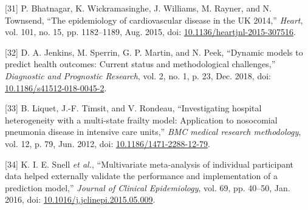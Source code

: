 \documentclass[
]{article}
\newenvironment{cslreferences}%
  {}%
  {\par}
\begin{document}
\begin{cslreferences}
\leavevmode\hypertarget{ref-bhatnagar_epidemiology_2015}{}%
{[}31{]} P. Bhatnagar, K. Wickramasinghe, J. Williams, M. Rayner, and N. Townsend, ``The epidemiology of cardiovascular disease in the UK 2014,'' \emph{Heart}, vol. 101, no. 15, pp. 1182--1189, Aug. 2015, doi: \href{https://doi.org/10.1136/heartjnl-2015-307516}{10.1136/heartjnl-2015-307516}.

\leavevmode\hypertarget{ref-jenkins_dynamic_2018}{}%
{[}32{]} D. A. Jenkins, M. Sperrin, G. P. Martin, and N. Peek, ``Dynamic models to predict health outcomes: Current status and methodological challenges,'' \emph{Diagnostic and Prognostic Research}, vol. 2, no. 1, p. 23, Dec. 2018, doi: \href{https://doi.org/10.1186/s41512-018-0045-2}{10.1186/s41512-018-0045-2}.

\leavevmode\hypertarget{ref-liquet_investigating_2012}{}%
{[}33{]} B. Liquet, J.-F. Timsit, and V. Rondeau, ``Investigating hospital heterogeneity with a multi-state frailty model: Application to nosocomial pneumonia disease in intensive care units,'' \emph{BMC medical research methodology}, vol. 12, p. 79, Jun. 2012, doi: \href{https://doi.org/10.1186/1471-2288-12-79}{10.1186/1471-2288-12-79}.

\leavevmode\hypertarget{ref-snell_multivariate_2016}{}%
{[}34{]} K. I. E. Snell \emph{et al.}, ``Multivariate meta-analysis of individual participant data helped externally validate the performance and implementation of a prediction model,'' \emph{Journal of Clinical Epidemiology}, vol. 69, pp. 40--50, Jan. 2016, doi: \href{https://doi.org/10.1016/j.jclinepi.2015.05.009}{10.1016/j.jclinepi.2015.05.009}.
\end{cslreferences}
\end{document}
